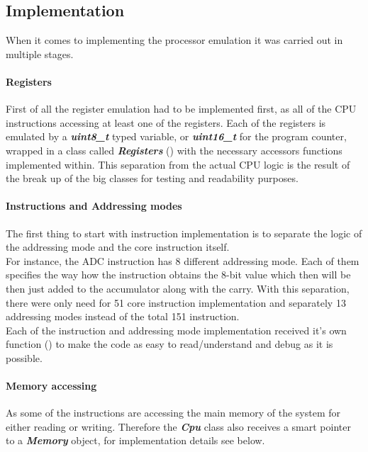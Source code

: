 \documentclass[]{report}
\begin{document}
\subsection{Implementation}
When it comes to implementing the processor emulation it was carried out in multiple stages.
\paragraph{Registers}
First of all the register emulation had to be implemented first, as all of the CPU instructions accessing at least one of the registers. Each of the registers is emulated by a \textbf{\textit{uint8\_t}} typed variable, or  \textbf{\textit{uint16\_t}} for the program counter, wrapped in a class called  \textbf{\textit{Registers}} (\cite{DREG}) with the necessary accessors functions implemented within. This separation from the actual CPU logic is the result of the break up of the big classes for testing and readability purposes.

\paragraph{Instructions and Addressing modes}
The first thing to start with instruction implementation is to separate the logic of the addressing mode and the core instruction itself.
\\
For instance, the ADC instruction has 8 different addressing mode. Each of them specifies the way how the instruction obtains the 8-bit value which then will be then just added to the accumulator along with the carry. 
With this separation, there were only need for 51 core instruction implementation and separately 13 addressing modes instead of the total 151 instruction. 
\\
Each of the instruction and addressing mode implementation received it's own function (\cite{DCPU}) to make the code as easy to read/understand and debug as it is possible.

\paragraph{Memory accessing}
As some of the instructions are accessing the main memory of the system for either reading or writing. Therefore  the  \textbf{\textit{Cpu}} class also receives a smart pointer to a \textbf{\textit{Memory}} object, for implementation details see below.
\end{document}

